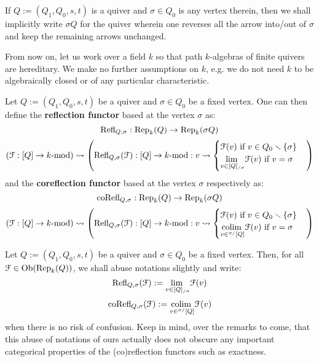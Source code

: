             \begin{convention}
                If $Q := (Q_1, Q_0, s, t)$ is a quiver and $\sigma \in Q_0$ is any vertex therein, then we shall implicitly write $\sigma Q$ for the quiver wherein one reverses all the arrow into/out of $\sigma$ and keep the remaining arrows unchanged.
            \end{convention}
            \begin{convention}
                From now on, let us work over a field $k$ so that path $k$-algebras of finite quivers are hereditary. We make no further assumptions on $k$, e.g. we do not need $k$ to be algebraically closed or of any particular characteristic.
            \end{convention}
            \begin{definition} \label{def: (co)reflection_functors}
                Let $Q := (Q_1, Q_0, s, t)$ be a quiver and $\sigma \in Q_0$ be a fixed vertex. One can then define the \textbf{reflection functor} based at the vertex $\sigma$ as:
                    $$\mathrm{Refl}_{Q, \sigma}: \mathrm{Rep}_k(Q) \to \mathrm{Rep}_k(\sigma Q)$$
                    $$(\mathcal{F}: [Q] \to k\text{-}\mathrm{mod}) \leadsto \left( \mathrm{Refl}_{Q, \sigma}(\mathcal{F}): [Q] \to k\text{-}\mathrm{mod}: v \leadsto \begin{cases} \text{$\mathcal{F}(v)$ if $v \in Q_0 \smallsetminus \{\sigma\}$} \\ \text{$\underset{v \in [Q]_{/\sigma}}{\operatorname{lim} \:} \mathcal{F}(v)$ if $v = \sigma$} \end{cases} \right)$$
                and the \textbf{coreflection functor} based at the vertex $\sigma$ respectively as:
                    $$\mathrm{co}\mathrm{Refl}_{Q, \sigma}: \mathrm{Rep}_k(Q) \to \mathrm{Rep}_k(\sigma Q)$$
                    $$(\mathcal{F}: [Q] \to k\text{-}\mathrm{mod}) \leadsto \left( \mathrm{Refl}_{Q, \sigma}(\mathcal{F}): [Q] \to k\text{-}\mathrm{mod}: v \leadsto \begin{cases} \text{$\mathcal{F}(v)$ if $v \in Q_0 \smallsetminus \{\sigma\}$} \\ \text{$\underset{v \in {}^{\sigma/}[Q]}{\operatorname{colim} \:} \mathcal{F}(v)$ if $v = \sigma$} \end{cases} \right)$$
            \end{definition}
            \begin{convention}
                Let $Q := (Q_1, Q_0, s, t)$ be a quiver and $\sigma \in Q_0$ be a fixed vertex. Then, for all $\mathcal{F} \in \mathrm{Ob}(\mathrm{Rep}_k(Q))$, we shall abuse notations slightly and write:
                    $$\mathrm{Refl}_{Q, \sigma}(\mathcal{F}) := \underset{v \in [Q]_{/\sigma}}{\operatorname{lim} \:} \mathcal{F}(v)$$
                    $$\mathrm{co}\mathrm{Refl}_{Q, \sigma}(\mathcal{F}) := \underset{v \in {}^{\sigma/}[Q]}{\operatorname{colim} \:} \mathcal{F}(v)$$
                when there is no risk of confusion. Keep in mind, over the remarks to come, that this abuse of notations of ours actually does not obscure any important categorical properties of the (co)reflection functors such as exactness.
            \end{convention}

